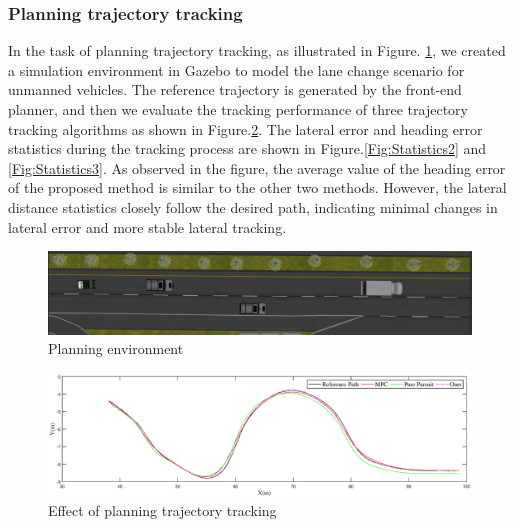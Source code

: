 \documentclass[sn-mathphys]{sn-jnl}%
\theoremstyle{thmstyleone}%
\theoremstyle{thmstyletwo}%
\theoremstyle{thmstylethree}%
\begin{document}
\subsubsection{Planning trajectory tracking}
In the task of planning trajectory tracking, as illustrated in Figure. \ref{fig:actual_trajectory}, we created a simulation environment in Gazebo to model the lane change scenario for unmanned vehicles. The reference trajectory is generated by the front-end planner, and then we evaluate the tracking performance of three trajectory tracking algorithms as shown in Figure.\ref{fig:traking2}. The lateral error and heading error statistics during the tracking process are shown in Figure.\ref{Fig:Statistics2} and \ref{Fig:Statistics3}. As observed in the figure, the average value of the heading error of the proposed method is similar to the other two methods. However, the lateral distance statistics closely follow the desired path, indicating minimal changes in lateral error and more stable lateral tracking.
\begin{figure}
	\centering
	\includegraphics[width=0.9\linewidth]{actual_trajectory}
	\caption{Planning environment}
	\label{fig:actual_trajectory}
\end{figure}

\begin{figure}
	\centering
	\includegraphics[width=1.0\linewidth]{track2}
	\caption{Effect of planning trajectory tracking}
	\label{fig:traking2}
\end{figure}
\end{document}
